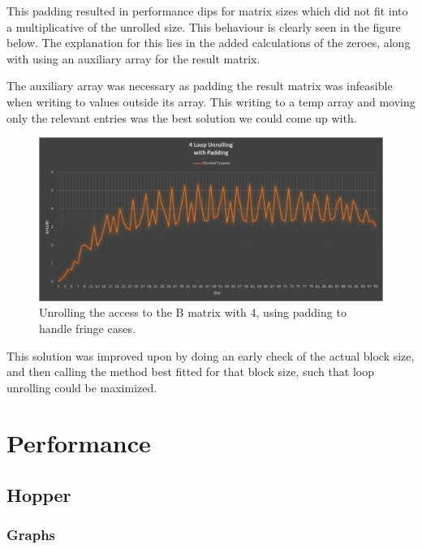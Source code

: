 \documentclass[a4paper,11pt,oneside]{book}
\begin{document}
This padding resulted in performance dips for matrix sizes which did not fit into a multiplicative of the unrolled size. This behaviour is clearly seen in the figure below. The explanation for this lies in the added calculations of the zeroes, along with using an auxiliary array for the result matrix.

The auxiliary array was necessary as padding the result matrix was infeasible when writing to values outside its array. This writing to a temp array and moving only the relevant entries was the best solution we could come up with.

\begin{figure}
  \centering
  \includegraphics[width=0.9\linewidth]{graph-blocked-padding.png}
  \caption{Unrolling the access to the B matrix with 4, using padding to handle fringe cases.}
  \centering
  \label{fig:sub1}
\end{figure}

This solution was improved upon by doing an early check of the actual block size, and then calling the method best fitted for that block size, such that loop unrolling could be maximized.

\chapter{Performance}

\section{Hopper}
\subsection{Graphs}
\end{document}
